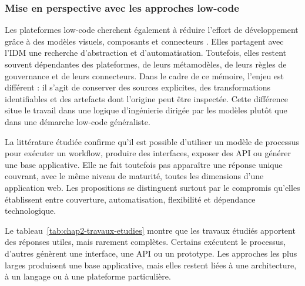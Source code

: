\subsubsection{Mise en perspective avec les approches low-code}

Les plateformes low-code cherchent également à réduire l'effort de développement grâce à des modèles visuels, composants et connecteurs \cite{rokis2023,pankowska2024}. Elles partagent avec l'IDM une recherche d'abstraction et d'automatisation. Toutefois, elles restent souvent dépendantes des plateformes, de leurs métamodèles, de leurs règles de gouvernance et de leurs connecteurs. Dans le cadre de ce mémoire, l'enjeu est différent : il s'agit de conserver des sources explicites, des transformations identifiables et des artefacts dont l'origine peut être inspectée. Cette différence situe le travail dans une logique d'ingénierie dirigée par les modèles plutôt que dans une démarche low-code généraliste.


La littérature étudiée confirme qu'il est possible d'utiliser un modèle de
processus pour exécuter un workflow, produire des interfaces, exposer des API
ou générer une base applicative. Elle ne fait toutefois pas apparaître une
réponse unique couvrant, avec le même niveau de maturité, toutes les dimensions
d'une application web. Les propositions se distinguent surtout par le
compromis qu'elles établissent entre couverture, automatisation, flexibilité et
dépendance technologique.

Le tableau~\ref{tab:chap2-travaux-etudies} montre que les travaux étudiés
apportent des réponses utiles, mais rarement complètes. Certains exécutent le
processus, d'autres génèrent une interface, une API ou un prototype. Les
approches les plus larges produisent une base applicative, mais elles restent
liées à une architecture, à un langage ou à une plateforme particulière.

